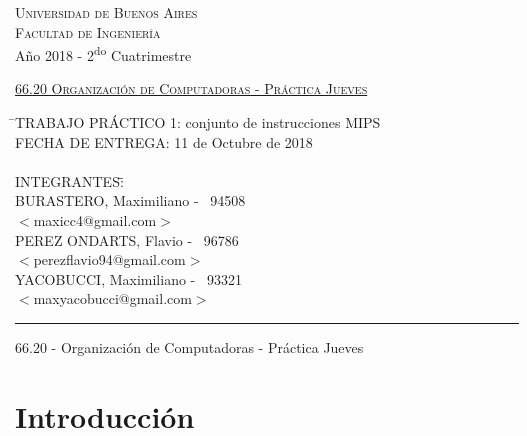 \documentclass[a4paper,10pt]{article}
\numberwithin{equation}{section}
\numberwithin{figure}{section}
\begin{document}
\begin{titlepage}

\thispagestyle{empty}

\begin{center}

\large{\textsc{Universidad de Buenos Aires}}\\
\large{\textsc{Facultad de Ingeniería}}\\
\small{Año 2018 - 2\textsuperscript{do} Cuatrimestre}
\end{center}

\vfill

\begin{center}
\Large{\underline{\textsc{66.20 Organización de Computadoras - Práctica Jueves}}}
\end{center}

\vfill

\begin{tabbing}
\hspace{2cm}\=\+TRABAJO PRÁCTICO 1: conjunto de instrucciones MIPS\\
	FECHA DE ENTREGA: 11 de Octubre de 2018\\
\\
	INTEGRANTES:\hspace{-1cm}\=\+\hspace{1cm}\=\hspace{6cm}\=\\
		BURASTERO, Maximiliano	\>\>- \ 94508\\
			\>\footnotesize{$<$maxicc4@gmail.com$>$}\\
		PEREZ ONDARTS, Flavio	\>\>- \ 96786\\
			\>\footnotesize{$<$perezflavio94@gmail.com$>$}\\
		YACOBUCCI, Maximiliano	\>\>- \ 93321\\
			\>\footnotesize{$<$maxyacobucci@gmail.com$>$}\\
\end{tabbing}

\vfill

\hrule
\vspace{0.2cm}

\noindent\small{66.20 - Organización de Computadoras - Práctica Jueves}

\end{titlepage}

\newpage





\section{Introducción}
\end{document}
